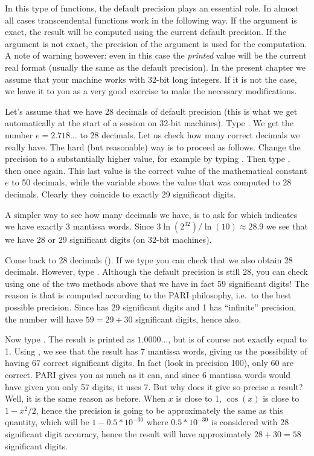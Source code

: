 In this type of functions, the default precision plays an essential role.
In almost all cases transcendental functions work in the following way.
If the argument is exact, the result will be computed using the current
default precision. If the argument is not exact, the precision of the
argument is used for the computation. A note of warning however: even in this
case the {\it printed\/} value will be the current real format (usually the
same as the default precision). In the present chapter we assume that your
machine works with 32-bit long integers. If it is not the case, we leave it
to you as a very good exercise to make the necessary modifications.

Let's assume that we have 28 decimals of default precision (this is what we
get automatically at the start of a  session on 32-bit machines). Type
. We get the number $e=2.718\dots$ to 28 decimals. Let us check
how many correct decimals we really have. The hard (but reasonable) way is to
proceed as follows. Change the precision to a substantially higher value, for
example by typing . Then type , then  once
again. This last value is the correct value of the mathematical constant $e$ to
50 decimals, while the variable  shows the value that was computed to 28
decimals. Clearly they coincide to exactly 29 significant digits.

A simpler way to see how many decimals we have, is to ask for 
which indicates we have exactly $3$ mantissa words. Since
$3\ln(2^{32}) / \ln(10)\approx28.9$ we see that we have 28 or 29 significant
digits (on 32-bit machines).

\smallskip
Come back to 28 decimals (). If we type 
you can check that we also obtain 28 decimals. However, type
. Although the default precision is still 28,
you can check using one of the two methods above that we have in fact 59
significant digits! The reason is that  is computed
according to the PARI philosophy, i.e.~to the best possible precision. Since
 has 29 significant digits and 1 has ``infinite'' precision, the
number  will have $59=29+30$ significant digits,
hence  also.

Now type . The result is printed as $1.0000\dots$, but
is of course not exactly equal to 1. Using , we see that the
result has 7 mantissa words, giving us the possibility of having 67
correct significant digits. In fact (look in precision 100), only 60 are
correct. PARI gives you as much as it can, and since 6 mantissa words
would have given you only 57 digits, it uses 7. But why does it give so
precise a result? Well, it is the same reason as before. When $x$ is close
to 1, $\cos(x)$ is close to $1-x^2/2$, hence the precision is going to be
approximately the same as this quantity, which will be $1-0.5*10^{-30}$ where
$0.5*10^{-30}$ is considered with 28 significant digit accuracy, hence the
result will have approximately $28+30=58$ significant digits.

